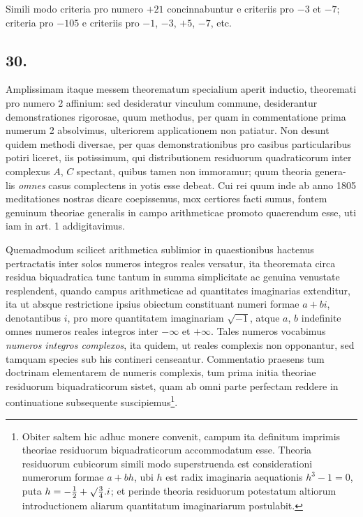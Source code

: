 \documentclass[twoside,12pt, showframe]{memoir}
\let\oldfrac\frac
\def\frac#1#2{\mathchoice{\tfrac{#1}{#2}}{\oldfrac{#1}{#2}}{\genfrac{}{}{}{2}{#1}{#2\mathstrut}}{\genfrac{}{}{}{3}{#1}{#2\mathstrut}}}
\begin{document}
Simili modo criteria pro numero \(+21\) concinnabuntur e criteriis pro \(-3\) et \(-7\); criteria pro \(-105\) e criteriis pro \(-1\), \(-3\), \(+5\), \(-7\), etc.

\subsection*{30.}
 
Amplissimam itaque messem theorematum specialium aperit inductio, theoremati pro numero 2 affinium: sed desideratur vinculum commune, desiderantur demonstrationes rigorosae, quum methodus, per quam in commentatione prima numerum 2 absolvimus, ulteriorem applicationem non patiatur. Non desunt quidem methodi diversae, per quas demonstrationibus pro casibus particularibus potiri liceret, iis potissimum, qui distributionem residuorum quadraticorum inter complexus \(A\), \(C\) spectant, quibus tamen non immoramur; quum theoria genera-\clearpage\noindent%
lis \textit{omnes} casus complectens in yotis esse debeat. Cui rei quum inde ab anno 1805 meditationes nostras dicare coepissemus, mox certiores facti sumus, fontem genuinum theoriae generalis in campo arithmeticae promoto quaerendum esse, uti iam in art. 1 addigitavimus.
 
Quemadmodum scilicet arithmetica sublimior in quaestionibus hactenus pertractatis inter solos numeros integros reales versatur, ita theoremata circa residua biquadratica tunc tantum in summa simplicitate ac genuina venustate resplendent, quando campus arithmeticae ad quantitates imaginarias extenditur, ita ut absque restrictione ipsius obiectum constituant numeri formae \(a+b i\), denotantibus \(i\), pro more quantitatem imaginariam \(\surd{-1}\), atque \(a\), \(b\) indefinite omnes numeros reales integros inter \(-\infty\) et \(+\infty\). Tales numeros vocabimus \textit{numeros integros complexos}, ita quidem, ut reales complexis non opponantur, sed tamquam species sub his contineri censeantur. Commentatio praesens tum doctrinam elementarem de numeris complexis, tum prima initia theoriae residuorum biquadraticorum sistet, quam ab omni parte perfectam reddere in continuatione subsequente suscipiemus\footnote{Obiter saltem hic adhuc monere convenit, campum ita definitum imprimis theoriae residuorum biquadraticorum accommodatum esse. Theoria residuorum cubicorum simili modo superstruenda est considerationi numerorum formae \(a+b h\), ubi \(h\) est radix imaginaria aequationis \(h^{3}-1=0\), puta \(h=-\frac{1}{2}+\surd{\frac{3}{4}}.i\); et perinde theoria residuorum potestatum altiorum introductionem aliarum quantitatum imaginariarum postulabit.}.
\end{document}
